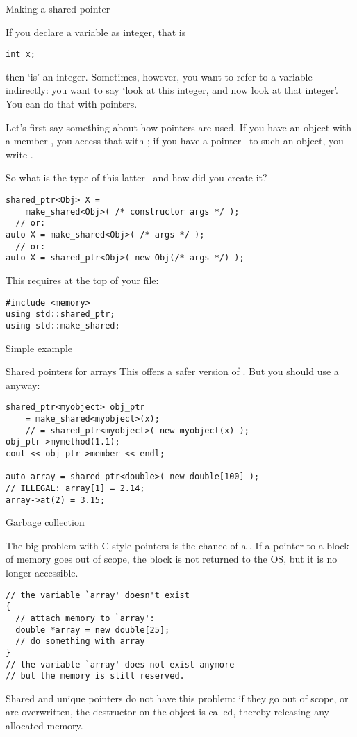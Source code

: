  {Making a shared pointer}
\label{sec:shared_ptr}

If you declare a variable  as integer, that is
\begin{verbatim}
int x;
\end{verbatim}
then  `is' an integer. Sometimes, however, you want to refer to a
variable indirectly: you want to say `look at this integer, and now
look at that integer'. You can do that with pointers.

Let's first say something about how pointers are used. If you have an
object  with a member , you access that with ; if you
have a pointer~ to such an object, you write .

So what is the type of this latter~ and how did you create it?
\begin{verbatim}
shared_ptr<Obj> X =
    make_shared<Obj>( /* constructor args */ );
  // or:
auto X = make_shared<Obj>( /* args */ );
  // or:
auto X = shared_ptr<Obj>( new Obj(/* args */) );
\end{verbatim}

This requires at the top of your file:
\begin{verbatim}
#include <memory>
using std::shared_ptr;
using std::make_shared;
\end{verbatim}

\begin{block}{Simple example}
  \label{sl:shared-ptr}
\end{block}

\begin{slide}{Shared pointers for arrays}
This offers a safer version of . But you should use a
 anyway:
\begin{verbatim}
shared_ptr<myobject> obj_ptr
    = make_shared<myobject>(x);
    // = shared_ptr<myobject>( new myobject(x) );
obj_ptr->mymethod(1.1);
cout << obj_ptr->member << endl;

auto array = shared_ptr<double>( new double[100] );
// ILLEGAL: array[1] = 2.14;
array->at(2) = 3.15;
\end{verbatim}
\end{slide}

 {Garbage collection}

The big problem with C-style pointers is the chance of a
. If a pointer to a block of memory goes out of
scope, the block is not returned to the \ac{OS}, but it is no longer
accessible.
\begin{verbatim}
// the variable `array' doesn't exist
{
  // attach memory to `array':
  double *array = new double[25];
  // do something with array
}
// the variable `array' does not exist anymore
// but the memory is still reserved.
\end{verbatim}
Shared and unique
pointers do not have this problem: if they go out of scope, or are
overwritten, the destructor on the object is called, thereby releasing
any allocated memory.

